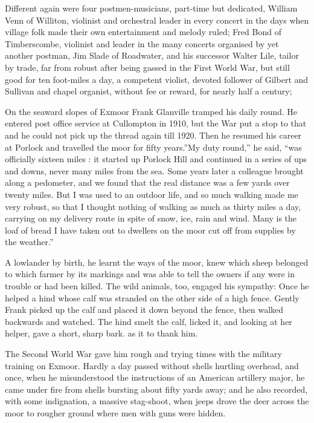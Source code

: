 Different again were four postmen-musicians, part-time but dedicated, William Venn of Williton, violinist and orchestral leader in every concert in the days when village folk made their own entertainment and melody ruled; Fred Bond of Timberscombe, violinist and leader in the many concerts organised by yet another postman, Jim Slade of Roadwater, and his successor Walter Lile, tailor by trade, far from robust after being gassed in the First World War, but still good for ten foot-miles a day, a competent violist, devoted follower of Gilbert and Sullivan and chapel organist, without fee or reward, for nearly half a century; 	

On the seaward slopes of Exmoor Frank Glanville tramped his daily round. He entered post office service at Cullompton in 1910, but the War put a stop to that and he could not pick up the thread again till 1920. Then he resumed his career at Porlock and travelled the moor for fifty years.”My duty round,” he said, “was officially sixteen miles : it started up Porlock Hill and continued in a series of ups and downs, never many miles from the sea. Some years later a colleague brought along a pedometer, and we found that the real distance was a few yards over twenty miles. But I was used to an outdoor life, and so much walking made me very robust, so that I thought nothing of walking as much as thirty miles a day, carrying on my delivery route in spite of snow, ice, rain and wind. Many is the loaf of bread I have taken out to dwellers on the moor cut off from supplies by the weather.”

A lowlander by birth, he learnt the ways of the moor, knew which sheep belonged to which farmer by its markings and was able to tell the owners if any were in trouble or had been killed. The wild animals, too, engaged his sympathy: Once he helped a hind whose calf was stranded on the other side of a high fence. Gently Frank picked up the calf and placed it down beyond the fence, then walked backwards and watched. The hind smelt the calf, licked it, and looking at her helper, gave a short, sharp bark. as it to thank him. 	

The Second World War gave him rough and trying times with the military training on Exmoor. Hardly a day passed without shells hurtling overhead, and once, when he misunderstood the instructions of an American artillery major, he came under fire from shells bursting about fifty yards away; and he also recorded, with some indignation, a massive stag-shoot, when jeeps drove the deer across the moor to rougher ground where men with guns were hidden.

